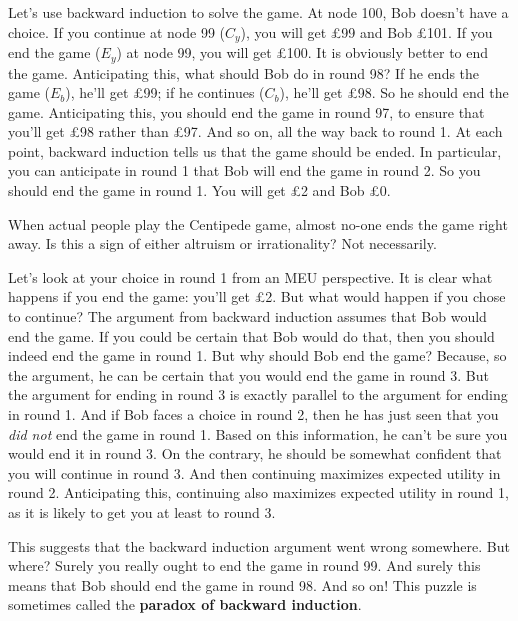 Let's use backward induction to solve the game. At node 100, Bob doesn't have a
choice. If you continue at node 99 ($C_{y}$), you will get £99 and Bob £101. If
you end the game ($E_{y}$) at node 99, you will get £100. It is obviously better
to end the game. Anticipating this, what should Bob do in round 98? If he ends
the game ($E_b$), he'll get £99; if he continues ($C_b$), he'll get £98. So he
should end the game. Anticipating this, you should end the game in round 97, to
ensure that you'll get £98 rather than £97. And so on, all the way back to round
1. At each point, backward induction tells us that the game should be ended. In
particular, you can anticipate in round 1 that Bob will end the game in round 2.
So you should end the game in round 1. You will get £2 and Bob £0.


When actual people play the Centipede game, almost no-one ends the game right
away. Is this a sign of either altruism or irrationality? Not necessarily.

Let's look at your choice in round 1 from an MEU perspective. It is clear what
happens if you end the game: you'll get £2. But what would happen if you chose
to continue? The argument from backward induction assumes that Bob would end the
game. If you could be certain that Bob would do that, then you should indeed end
the game in round 1. But why should Bob end the game? Because, so the argument,
he can be certain that you would end the game in round 3. But the argument for
ending in round 3 is exactly parallel to the argument for ending in round 1. And
if Bob faces a choice in round 2, then he has just seen that you \emph{did not}
end the game in round 1. Based on this information, he can't be sure you would
end it in round 3. On the contrary, he should be somewhat confident that you
will continue in round 3. And then continuing maximizes expected utility in
round 2. Anticipating this, continuing also maximizes expected utility in round
1, as it is likely to get you at least to round 3.

This suggests that the backward induction argument went wrong somewhere. But
where? Surely you really ought to end the game in round 99. And surely this
means that Bob should end the game in round 98. And so on! This puzzle is
sometimes called the \textbf{paradox of backward induction}.


